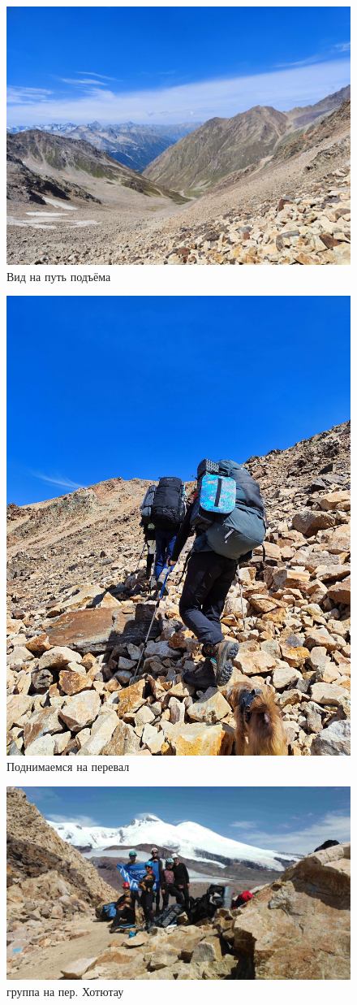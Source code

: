\begin{figure}[h!]
	\centering
	\includegraphics[width=0.7\linewidth]{../pics/IMG_20240830_105443}
	\caption{Вид на путь подъёма}
	\label{fig:IMG_20240830_105443}
\end{figure}

\begin{figure}[h!]
	\centering
	\includegraphics[width=0.7\linewidth]{../pics/IMG_20240830_105447}
	\caption{Поднимаемся на перевал}
	\label{fig:IMG_20240830_105447}
\end{figure}

\begin{figure}[h!]
	\centering
	\includegraphics[width=0.7\linewidth]{../pics/DJI_0899}
	\caption{группа на пер. Хотютау}
	\label{fig:hotyutau_1}
\end{figure}

